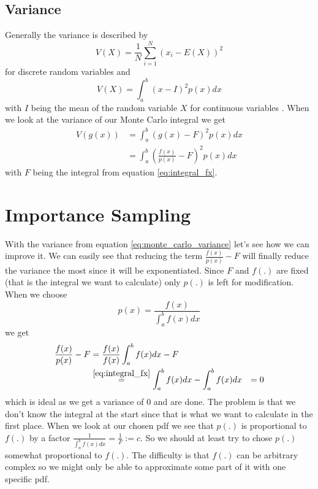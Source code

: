 \subsection{Variance}
\label{sec:variance}
Generally the variance is described by $$ V(X) = \frac{1}{N} \sum_{i = 1}^N (x_i - E(X))^2 $$ for discrete random variables \cite{pris}
and $$ V(X) = \int_{a}^b (x - I)^2 p(x) dx $$ with $ I $ being the mean of the random variable $ X $ for continuous variables \cite{wyzant}.
When we look at the variance of our Monte Carlo integral we get
\begin{equation}
\label{eq:monte_carlo_variance}
\begin{aligned}
    V(g(x)) &= \int_{a}^b (g(x) - F)^2 p(x) dx \\
            &= \int_{a}^b \left(\frac{f(x)}{p(x)} - F\right)^2 p(x) dx
\end{aligned}
\end{equation}
with $ F $ being the integral from equation \ref{eq:integral_fx}.


\section{Importance Sampling}
\label{sec:importance_sampling}
With the variance from equation \ref{eq:monte_carlo_variance} let's see how we can improve it.
We can easily see that reducing the term $ \frac{f(x)}{p(x)} - F $ will finally reduce the variance the most since it will be exponentiated.
Since $ F $ and $ f(.) $ are fixed (that is the integral we want to calculate) only $ p(.) $ is left for modification.
When we choose $$ p(x) = \frac{f(x)}{\int_{a}^b f(x) dx} $$ we get
\begin{equation*}
\begin{aligned}
    \frac{f(x)}{p(x)} - F &= \frac{f(x)}{f(x)}\int_{a}^b f(x) dx - F \\
        &\stackrel{\ref{eq:integral_fx}}{=} \int_{a}^b f(x) dx - \int_{a}^b f(x) dx
        &= 0
\end{aligned}
\end{equation*}
which is ideal as we get a variance of 0 and are done.
The problem is that we don't know the integral at the start since that is what we want to calculate in the first place.
When we look at our chosen pdf we see that $ p(.) $ is proportional to $ f(.) $ by a factor $ \frac{1}{\int_{a}^b f(x) dx} = \frac{1}{F} := c $.
So we should at least try to chose $ p(.) $ somewhat proportional to $ f(.) $.
The difficulty is that $ f(.) $ can be arbitrary complex so we might only be able to approximate some part of it with one specific pdf.


